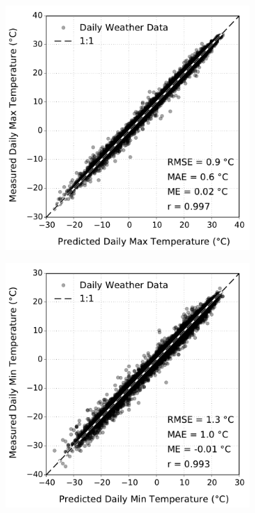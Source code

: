\documentclass[TechnicalNoteMeteo.tex]{subfiles}
\begin{document}
\begin{figure}[!bh]
    \begin{subfigure}{0.3\textwidth}
        \includegraphics[width=\textwidth]{img/Max_Temp_(deg_C)}
        \caption{}
        \label{subfig:maxtemp_err} 
    \end{subfigure} 
    \hspace{0.04\textwidth}   
    \begin{subfigure}{0.3\textwidth}
        \includegraphics[width=\textwidth]{img/Min_Temp_(deg_C)}

\end{subfigure}
\end{figure}
\end{document}
